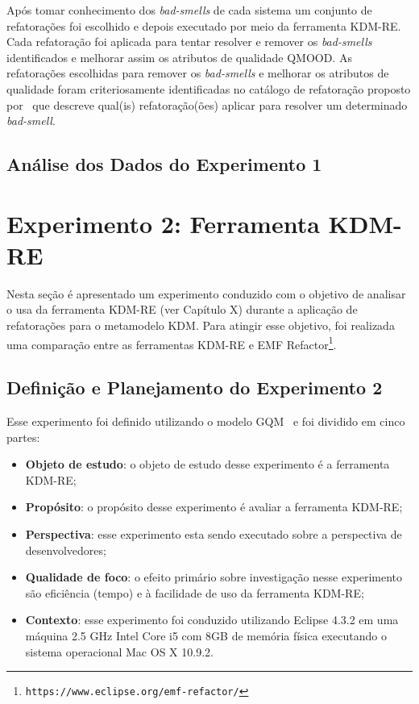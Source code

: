 Após tomar conhecimento dos \textit{bad-smells} de cada sistema um conjunto de refatorações foi escolhido e depois executado por meio da ferramenta KDM-RE. Cada refatoração foi aplicada para tentar resolver e remover os \textit{bad-smells} identificados e melhorar assim os atributos de qualidade QMOOD. As refatorações escolhidas para remover os \textit{bad-smells} e melhorar os atributos de qualidade foram criteriosamente identificadas no catálogo de refatoração proposto por~ que descreve qual(is) refatoração(ões) aplicar para resolver um determinado \textit{bad-smell}. 


\subsection{Análise dos Dados do Experimento 1}



\section{Experimento 2: Ferramenta KDM-RE}\label{sec:experimento_KDM_re}

Nesta seção é apresentado um experimento conduzido com o objetivo de analisar o usa da ferramenta KDM-RE (ver Capítulo X) durante a aplicação de refatorações para o metamodelo KDM. Para atingir esse objetivo, foi realizada uma comparação entre as ferramentas KDM-RE e EMF Refactor\footnote{\texttt{https://www.eclipse.org/emf-refactor/}}.

\subsection{Definição e Planejamento do Experimento 2}

Esse experimento foi definido utilizando o modelo GQM~\cite{Wohlin} e foi dividido em cinco partes:

\begin{itemize}
\item \textbf{Objeto de estudo}: o objeto de estudo desse experimento é a ferramenta KDM-RE;
\item \textbf{Propósito}: o propósito desse experimento é avaliar a ferramenta KDM-RE;
\item \textbf{Perspectiva}: esse experimento esta sendo executado sobre a perspectiva de desenvolvedores;
\item \textbf{Qualidade de foco}: o efeito primário sobre investigação nesse experimento são eficiência (tempo) e à facilidade de uso da ferramenta KDM-RE;
\item \textbf{Contexto}: esse experimento foi conduzido utilizando Eclipse 4.3.2 em uma máquina 2.5 GHz Intel Core i5 com 8GB de memória física executando o sistema operacional Mac OS X 10.9.2.
\end{itemize}

